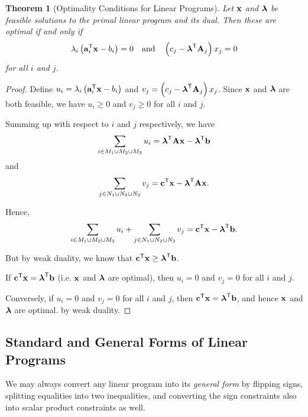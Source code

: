 \documentclass[11pt]{article}
\newtheorem{theorem}{Theorem}[section]
\theoremstyle{definition}
\theoremstyle{remark}
\newcommand{\pqty}[1]{\left(#1\right)}
\newcommand{\transpose}{^{\mathsf{T}}}
\newcommand{\qand}{\quad\text{and}\quad}
\begin{document}
\begin{theorem}[Optimality Conditions for Linear Programs]\label{optim-unit-0043}
    \label{thm:optimality-condition-lp}%
    Let \(\vb{x}\) and \(\vb*{\lambda}\) be feasible solutions to the primal linear program and its dual. Then these are optimal if and only if
    \[
        \lambda_i \pqty{\vb{a}_i \transpose \vb{x} - b_i} = 0 \qand \pqty{c_j - \vb*{\lambda}\transpose \vb{A}_j} x_j = 0
    \]
    for all \(i\) and \(j\).
\end{theorem}

\begin{proof}
    Define \(u_i = \lambda_i \pqty{\vb{a}_i \transpose \vb{x} - b_i}\) and \(v_j = \pqty{c_j - \vb*{\lambda}\transpose \vb{A}_j} x_j\). Since \(\vb{x}\) and \(\vb*{\lambda}\) are both feasible, we have \(u_i \geq 0\) and \(v_j \geq 0\) for all \(i\) and \(j\).

    Summing up with respect to \(i\) and \(j\) respectively, we have
    \[
        \sum_{i \in M_1 \cup M_2 \cup M_3} u_i = \vb*{\lambda}\transpose \vb{A} \vb{x} - \vb*{\lambda}\transpose \vb{b}
    \]
    and
    \[
        \sum_{j \in N_1 \cup N_2 \cup N_3} v_j = \vb{c}\transpose \vb{x} - \vb*{\lambda}\transpose \vb{A} \vb{x}.
    \]

    Hence,
    \[
        \sum_{i \in M_1 \cup M_2 \cup M_3} u_i + \sum_{j \in N_1 \cup N_2 \cup N_3} v_j = \vb{c}\transpose \vb{x} - \vb*{\lambda}\transpose \vb{b}.
    \]

    But by weak duality, we know that \(\vb{c}\transpose \vb{x} \geq \vb*{\lambda}\transpose \vb{b}\).

    If \(\vb{c}\transpose \vb{x} = \vb*{\lambda}\transpose \vb{b}\) (i.e. \(\vb{x}\) and \(\vb*{\lambda}\) are optimal), then \(u_i = 0\) and \(v_j = 0\) for all \(i\) and \(j\).

    Conversely, if \(u_i = 0\) and \(v_j = 0\) for all \(i\) and \(j\), then \(\vb{c}\transpose \vb{x} = \vb*{\lambda}\transpose \vb{b}\), and hence \(\vb{x}\) and \(\vb*{\lambda}\) are optimal. by weak duality.
\end{proof}

\subsection{Standard and General Forms of Linear Programs}

We may always convert any linear program into its \emph{general form} by flipping signs, splitting equalities into two inequalities, and converting the sign constraints also into scalar product constraints as well.
\end{document}
